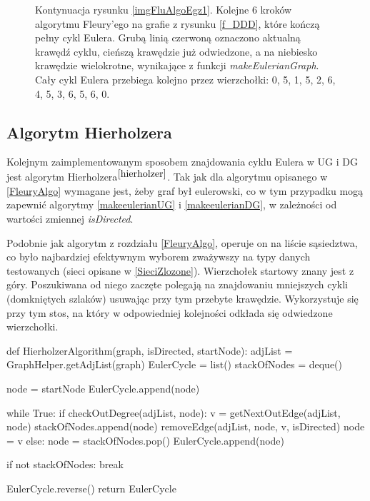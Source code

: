 \documentclass[a4paper, 12pt, twoside, openright]{article}
\begin{document}
\begin{figure}[!p]
		\quad
		
		\caption[]{Kontynuacja rysunku \ref{imgFluAlgoEgz1}. Kolejne 6 kroków algorytmu Fleury'ego na grafie z rysunku \ref{f_DDD}, które kończą pełny cykl Eulera. Grubą linią czerwoną oznaczono aktualną krawędź cyklu, cieńszą krawędzie już odwiedzone, a na niebiesko krawędzie wielokrotne, wynikające z funkcji \textit{makeEulerianGraph}. Cały  cykl Eulera przebiega kolejno przez wierzchołki: 0, 5, 1, 5, 2, 6, 4, 5, 3, 6, 5, 6, 0.}
		\label{imgFluAlgoEgz2}
	\end{figure}


\subsection{Algorytm Hierholzera} \label{hier}
\indent\par
	Kolejnym zaimplementowanym sposobem znajdowania cyklu Eulera w UG i DG jest algorytm Hierholzera$^{\cite{hierholzer}}$. Tak jak dla algorytmu opisanego w \ref{FleuryAlgo} wymagane jest, żeby graf był eulerowski, co w tym przypadku mogą zapewnić algorytmy \ref{makeeulerianUG} i \ref{makeeulerianDG}, w zależności od wartości zmiennej \textit{isDirected}.
	
	Podobnie jak algorytm z rozdziału \ref{FleuryAlgo}, operuje on na liście sąsiedztwa, co było najbardziej efektywnym wyborem zważywszy na typy danych testowanych (sieci opisane w \ref{SieciZlozone}). Wierzchołek startowy znany jest z góry. Poszukiwana od niego zaczęte polegają na znajdowaniu mniejszych cykli (domkniętych szlaków) usuwając przy tym przebyte krawędzie. Wykorzystuje się przy tym stos, na który w odpowiedniej kolejności odkłada się odwiedzone wierzchołki.
	
\captionsetup{justification=centering}
\begin{algorithm}[caption={\textit{HierholzerAlgorithm} funkcja wyznaczająca ścieżkę dla grafów skierowanych i nieskierowanych }, label={HierholzerAlgorithm}]
def HierholzerAlgorithm(graph, isDirected, startNode):
	adjList = GraphHelper.getAdjList(graph)
	EulerCycle = list()
	stackOfNodes = deque()
	
	node = startNode
	EulerCycle.append(node)
	
	while True:
		if checkOutDegree(adjList, node):
			v = getNextOutEdge(adjList, node)
			stackOfNodes.append(node)
			removeEdge(adjList, node, v, isDirected)
			node = v
		else:
			node = stackOfNodes.pop()
			EulerCycle.append(node)
		
		if not stackOfNodes:
			break
		
	EulerCycle.reverse()
	return EulerCycle
\end{algorithm}
\end{document}
